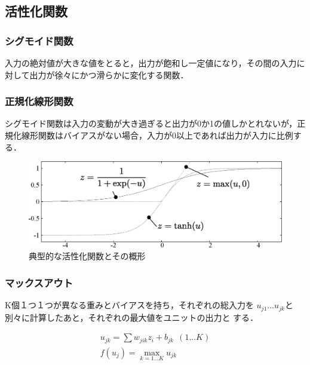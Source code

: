 \documentclass[a4paper,10pt]{jsarticle}
\begin{document}
\subsection{活性化関数}
\subsubsection{シグモイド関数}
入力の絶対値が大きな値をとると，出力が飽和し一定値になり，その間の入力に
対して出力が徐々にかつ滑らかに変化する関数．
\subsubsection{正規化線形関数}
シグモイド関数は入力の変動が大き過ぎると出力が0か1の値しかとれないが，正
規化線形関数はバイアスがない場合，入力が0以上であれば出力が入力に比例す
る．
\begin{figure}[b]
 \centering
 \includegraphics[scale=0.55]{fig/eps/sigmoid.eps}
    \caption{典型的な活性化関数とその概形}
    \label{sigmoid}
\end{figure}
\subsubsection{マックスアウト}
K個１つ１つが異なる重みとバイアスを持ち，それぞれの総入力を
$u_{j1}$...$u_{jk}$と別々に計算したあと，それぞれの最大値をユニットの出力と
する．

\begin{align}
 u_{jk}=\sum w_{jik}z_i +b_{jk}\ \ (1...K)\\
 f(u_{j})=\max_{k=1...K}u_{jk}
\end{align}
\end{document}
